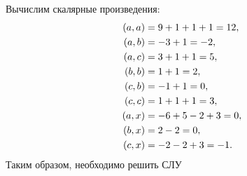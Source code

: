 \documentclass[12pt]{article}
\begin{document}
    Вычислим скалярные произведения:
    \begin{align*}
        \left ( a, a \right ) & = 9 + 1 + 1 + 1 = 12, \\
        \left ( a, b \right ) & = -3 + 1 = -2, \\
        \left ( a, c \right ) & = 3 + 1 + 1 = 5, \\
        \left ( b, b \right ) & = 1 + 1 = 2, \\
        \left ( c, b \right ) & = -1 + 1 = 0, \\
        \left ( c, c \right ) & = 1 + 1 + 1 = 3, \\
        \left ( a, x \right ) & = -6 + 5 - 2 + 3 = 0, \\
        \left ( b, x \right ) & = 2 - 2 = 0, \\
        \left ( c, x \right ) & = -2 - 2 + 3 = -1 .
    \end{align*}
    Таким образом, необходимо решить СЛУ
\end{document}

